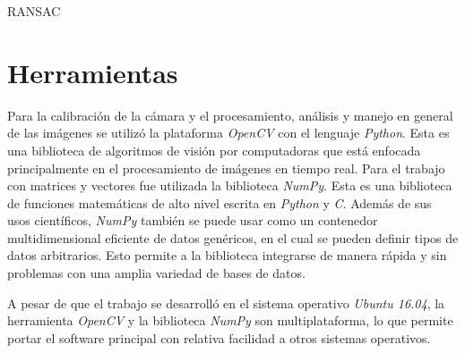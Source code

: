RANSAC

\section{Herramientas}

Para la calibración de la cámara y el procesamiento, análisis y manejo en general de las imágenes se utilizó la plataforma \textit{OpenCV} con el lenguaje \textit{Python}. Esta es una biblioteca de algoritmos de visión por computadoras que está enfocada principalmente en el procesamiento de imágenes en tiempo real. Para el trabajo con matrices y vectores fue utilizada la biblioteca \textit{NumPy}. Esta es una biblioteca de funciones matemáticas de alto nivel escrita en \textit{Python} y \textit{C}. Además de sus usos científicos, \textit{NumPy} también se puede usar como un contenedor multidimensional eficiente de datos genéricos, en el cual se pueden definir tipos de datos arbitrarios. Esto permite a la biblioteca integrarse de manera rápida y sin problemas con una amplia variedad de bases de datos.

A pesar de que el trabajo se desarrolló en el sistema operativo \textit{Ubuntu 16.04}, la herramienta \textit{OpenCV} y la biblioteca \textit{NumPy} son multiplataforma, lo que permite portar el software principal con relativa facilidad a otros sistemas operativos.
